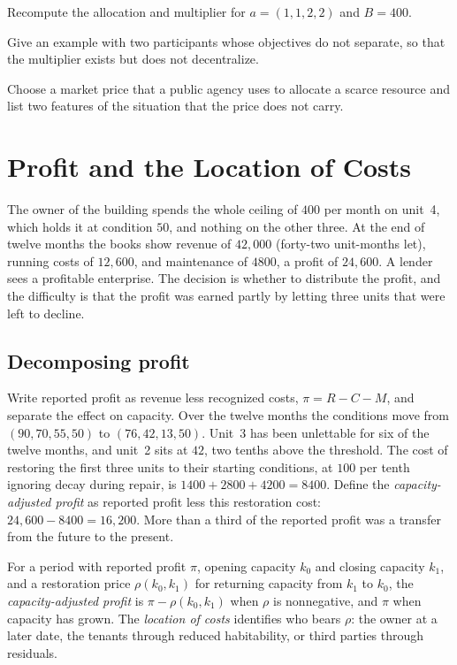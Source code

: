 \begin{exercise}
Recompute the allocation and multiplier for $a=(1,1,2,2)$ and $B=400$.
\end{exercise}
\begin{exercise}
Give an example with two participants whose objectives do not separate, so that the multiplier exists but does not decentralize.
\end{exercise}
\begin{exercise}
Choose a market price that a public agency uses to allocate a scarce resource and list two features of the situation that the price does not carry.
\end{exercise}

\chapter{Profit and the Location of Costs}\label{ch:18}

The owner of the building spends the whole ceiling of $400$ per month on unit~4, which holds it at condition $50$, and nothing on the other three. At the end of twelve months the books show revenue of $42{,}000$ (forty-two unit-months let), running costs of $12{,}600$, and maintenance of $4800$, a profit of $24{,}600$. A lender sees a profitable enterprise. The decision is whether to distribute the profit, and the difficulty is that the profit was earned partly by letting three units that were left to decline.

\section{Decomposing profit}

Write reported profit as revenue less recognized costs, $\pi=R-C-M$, and separate the effect on capacity. Over the twelve months the conditions move from $(90,70,55,50)$ to $(76,42,13,50)$. Unit~3 has been unlettable for six of the twelve months, and unit~2 sits at $42$, two tenths above the threshold. The cost of restoring the first three units to their starting conditions, at $100$ per tenth ignoring decay during repair, is $1400+2800+4200=8400$. Define the \emph{capacity-adjusted profit} as reported profit less this restoration cost: $24{,}600-8400=16{,}200$. More than a third of the reported profit was a transfer from the future to the present.

\begin{definition}\label{def:cap-profit}
For a period with reported profit $\pi$, opening capacity $k_0$ and closing capacity $k_1$, and a restoration price $\rho(k_0,k_1)$ for returning capacity from $k_1$ to $k_0$, the \emph{capacity-adjusted profit} is $\pi-\rho(k_0,k_1)$ when $\rho$ is nonnegative, and $\pi$ when capacity has grown. The \emph{location of costs} identifies who bears $\rho$: the owner at a later date, the tenants through reduced habitability, or third parties through residuals.
\end{definition}

